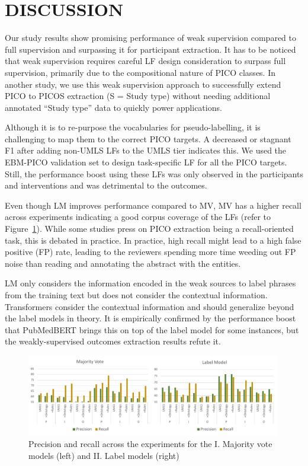 \documentclass[10.7pt,]{article}
\begin{document}
\section{DISCUSSION}\label{discussion}
%
Our study results show promising performance of weak supervision compared to full supervision and surpassing it for participant extraction.
It has to be noticed that weak supervision requires careful LF design consideration to surpass full supervision, primarily due to the compositional nature of PICO classes.
In another study, we use this weak supervision approach to successfully extend PICO to PICOS extraction (S = Study type) without needing additional annotated ``Study type'' data to quickly power applications.\cite{dhrangadhariya2023picos}


Although it is to re-purpose the vocabularies for pseudo-labelling, it is challenging to map them to the correct PICO targets.
A decreased or stagnant F1 after adding non-UMLS LFs to the UMLS tier indicates this.
We used the EBM-PICO validation set to design task-specific LF for all the PICO targets.
Still, the performance boost using these LFs was only observed in the participants and interventions and was detrimental to the outcomes.

Even though LM improves performance compared to MV, MV has a higher recall across experiments indicating a good corpus coverage of the LFs (refer to Figure~\ref{fig:precRecall}).
While some studies press on PICO extraction being a recall-oriented task, this is debated in practice.
In practice, high recall might lead to a high false positive (FP) rate, leading to the reviewers spending more time weeding out FP noise than reading and annotating the abstract with the entities.\cite{liu2021sent2span}


LM only considers the information encoded in the weak sources to label phrases from the training text but does not consider the contextual information.
Transformers consider the contextual information and should generalize beyond the label models in theory.
It is empirically confirmed by the performance boost that PubMedBERT brings this on top of the label model for some instances, but the weakly-supervised outcomes extraction results refute it.
%
\begin{figure}[!h]
    \centering
    \includegraphics[width=0.99\textwidth]{figures/precRecall.pdf}
    \caption{Precision and recall across the experiments for the I. Majority vote models (left) and II. Label models (right)}
    \label{fig:precRecall}
\end{figure}
%
%
%
\end{document}

